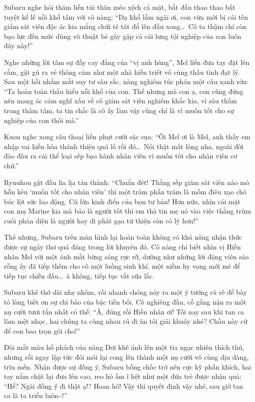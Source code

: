 \documentclass[../main.tex]{subfiles}
\begin{document}
Subaru nghe hỏi thăm liền tủi thân méo xệch cả mặt, bắt đầu thao thao bất tuyệt kể lể nỗi khổ tâm với cô nàng: ``Dạ khổ lắm ngài ơi, con vừa mới bị cái tên giám sát viên độc ác kia mắng chửi té tát đổ lên đầu xong\dots\ Cô ta thậm chí còn bạo lực đến mức dùng võ thuật bẻ gãy gập cả cái lưng tội nghiệp của con luôn đây này!''

Nghe những lời tâm sự đầy cay đắng của ``vị anh hùng'', Mel liền đưa tay đặt lên cằm, gật gù ra vẻ thông cảm như một nhà hiền triết vô cùng thấu tình đạt lý. Sau một hồi nhắm mắt suy tư sâu sắc, nàng nghiêm túc phán một câu xanh rờn: ``Ta hoàn toàn thấu hiểu nỗi khổ của con. Thế nhưng mà con ạ, con cũng đừng nên mang ác cảm nghĩ xấu về cô giám sát viên nghiêm khắc kia, vì sâu thẳm trong thâm tâm, ta tin chắc là cô ấy làm vậy cũng chỉ là vì muốn tốt cho sự nghiệp của con thôi mà.''


\il

Kuon nghe xong câu thoại liền phụt cười sặc sụa: ``Ôi Mel ơi là Mel, anh thấy em nhập vai hiền hòa thánh thiện quá lố rồi đó\dots\ Nói thật mất lòng nha, ngoài đời đào đâu ra cái thể loại sếp bạo hành nhân viên vì muốn tốt cho nhân viên cơ chứ.''

Ryuuhou gật đầu lia lịa tán thành: ``Chuẩn đét! Thằng sếp giám sát viên nào mỏ hỗn kêu `muốn tốt cho nhân viên' thì một trăm phần trăm là mồm điêu xạo chó bóc lột sức lao động. Cú lừa kinh điển của bọn tư bản! Hơn nữa, nhìn cái mặt con mụ Marine kia mà bảo là người tốt thì em thà tin mẹ nó vào việc thằng trùm cuối phản diện là người hay đi phát gạo từ thiện còn có lý hơn!''

\il

Thế nhưng, Subaru trên màn hình lại hoàn toàn không có khả năng nhận thức được sự ngây thơ quá đáng trong lời khuyên đó. Cô nàng chỉ biết nhìn vị Hiền nhân Mel với một ánh mắt bừng sáng rực rỡ, dường như những lời động viên sáo rỗng ấy đã tiếp thêm cho cô một luồng sinh khí, một niềm hy vọng mới mẻ để tiếp tục chiến đấu\dots\ à không, tiếp tục vắt sữa lắc.

Subaru khẽ thở dài nhẹ nhõm, rồi nhanh chóng nảy ra một ý tưởng rủ rê để bày tỏ lòng biết ơn sự chỉ bảo của bậc tiền bối. Cô nghiêng đầu, cố gắng nặn ra một nụ cười tươi tắn nhất có thể: ``À, đúng rồi Hiền nhân ơi! Tối nay sau khi tan ca làm mệt nhọc, hai chúng ta cùng nhau rủ đi ăn tối giải khuây nhé? Chầu này cứ để con bao trọn gói cho!''

Đôi mắt màu hổ phách của nàng Dơi khẽ ánh lên một tia ngạc nhiên thích thú, nhưng rồi ngay lập tức đôi môi lại cong lên thành một nụ cười vô cùng dịu dàng, trìu mến. Nhận được sự đồng ý, Subaru bỗng chốc trở nên cực kỳ phấn khích, hai tay nắm chặt lại đưa lên cao, reo hò ầm ĩ hệt như một đứa trẻ được nhận quà: ``Hể? Ngài đồng ý đi thật ạ!? Hoan hô! Vậy thì quyết định vậy nhé, sau giờ tan ca là ta triển luôn\~{}!''
\end{document}
